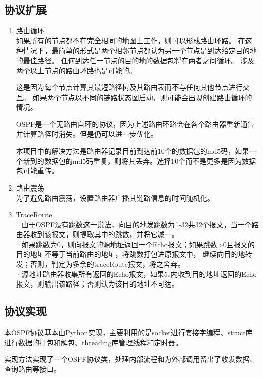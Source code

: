 	\subsection{协议扩展} %
	\label{sub:协议扩展}
		\begin{enumerate}
			\item 路由循环\\
				如果所有的节点都不在完全相同的地图上工作，则可以形成路由环路。 在这种情况下，最简单的形式是两个相邻节点都认为另一个节点是到达给定目的地的最佳路径。 任何到达任一节点的目的地的数据包将在两者之间循环。 涉及两个以上节点的路由环路也是可能的。
				\par 这是因为每个节点计算其最短路径树及其路由表而不与任何其他节点进行交互。 如果两个节点以不同的链路状态图启动，则可能会出现创建路由循环的情况。
				\par OSPF是一个无路由自环的协议，因为上述路由环路会在各个路由器重新通告并计算路径时消失。但是仍可以进一步优化。
				\par 本项目中的解决方法是路由器记录目前到达前10个的数据包的md5码，如果一个新到的数据包的md5码重复，则将其丢弃。选择10个而不是更多是因为数据包可能重传。
			\item 路由震荡\\
				为了避免路由震荡，设置路由器广播其链路信息的时间随机化。
			\item TraceRoute\\
				·由于OSPF没有跳数这一说法，向目的地发跳数为1-32共32个报文，当一个路由器收到该报文，则提取其中的跳数，并将它减一。\\
				·如果跳数为0，则向报文的源地址返回一个Echo报文；如果跳数>0且报文的目的地址不等于当前路由的地址，将跳数打包进原报文中，
				继续向目的地转发；否则，判定为多余的traceRoute报文，将之舍弃。\\
				·源地址路由器收集所有返回的Echo报文，如果5s内收到目的地址返回的Echo报文，则输出该路径；否则认为该目的地址不可达。
		\end{enumerate}
	\subsection{协议实现} %
	\label{sub:协议实现}
		本OSPF协议基本由Python实现，主要利用的是socket进行套接字编程、struct库进行数据的打包和解包、threading库管理线程和定时器。
		\par 实现方法实现了一个OSPF协议类，处理内部流程和为外部调用留出了收发数据、查询路由等接口。
